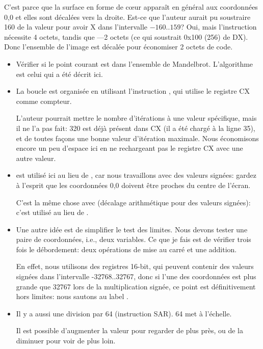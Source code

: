 \begin{itemize}
C'est parce que la surface en forme de c\oe{}ur apparaît en général aux coordonnées
0,0 et elles sont décalées vers la droite.
Est-ce que l'auteur aurait pu soustraire 160 de la valeur pour avoir X dans l'intervalle
$-160..159$?
Oui, mais l'instruction  nécessite 4 octets, tandis que
---2 octets (ce qui soustrait 0x100 (256) de DX).
Donc l'ensemble de l'image est décalée pour économiser 2 octets de code.

    \begin{itemize}
    \item Vérifier si le point courant
est dans l'ensemble de Mandelbrot.
          L'algorithme est celui qui a été décrit ici.
     \item La boucle 
est organisée en utilisant l'instruction , qui utilise le registre CX comme compteur.

L'auteur pourrait mettre le nombre d'itérations à une valeur spécifique, mais il
ne l'a pas fait: 320 est déjà présent dans CX (il a été chargé à la ligne 35), et
de toutes façons une bonne valeur d'itération maximale.
Nous économisons encore un peu d'espace ici en ne rechargeant pas le registre CX
avec une autre valeur.

     \item 
{} est utilisé ici au lieu de , car nous travaillons avec des valeurs
signées: gardez à l'esprit que les coordonnées 0,0 doivent être proches du centre de
l'écran.

C'est la même chose avec  (décalage arithmétique pour des valeurs signées):
c'est utilisé au lieu de .

     \item Une autre idée est de simplifier le test des limites.
Nous devons tester une paire de coordonnées, i.e., deux variables.
Ce que je fais est de vérifier trois fois le débordement: deux opérations de mise
au carré et une addition.  %

En effet, nous utilisons des registres 16-bit, qui peuvent contenir des valeurs signées
dans l'intervalle -32768..32767, donc si l'une des coordonnées est plus grande que
32767 lors de la multiplication signée, ce point est définitivement hors limites:
nous sautons au label .

     \item 
Il y a aussi une division par 64 (instruction SAR). 64 met à l'échelle.

Il est possible d'augmenter la valeur pour regarder de plus près, ou de la diminuer
pour voir de plus loin.


\end{itemize}
\end{itemize}
